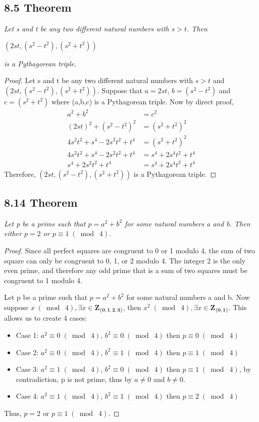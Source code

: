 \documentclass{article}
\begin{document}
\subsection*{8.5 Theorem} 
\quad \textit{Let s and t be any two different natural numbers with $s > t$. Then}
\begin{center}
    $(2st,(s^2-t^2),(s^2+t^2))$
\end{center}
\textit{is a Pythagorean triple.}

\begin{proof}
Let s and t be any two different natural numbers with $s > t$ and $(2st,(s^2-t^2),(s^2+t^2))$. Suppose that $a = 2st$, $b = (s^2-t^2)$ and $c = (s^2+t^2)$ where (a,b,c) is a Pythagorean triple. Now by direct proof,
\begin{align*}
    && a^2 + b^2 &= c^2&&\\
    && (2st)^2 + (s^2-t^2)^2 &= (s^2+t^2)^2&&\\
    && 4s^2t^2 + s^4-2s^2t^2+t^4 &= (s^2+t^2)^2&&\\
    && 4s^2t^2 + s^4 - 2s^2t^2 + t^4 &= s^4 + 2s^4t^2 + t^4&&\\
    && s^4 + 2s^2t^2 + t^4 &= s^4 + 2s^4t^2 + t^4&&
\end{align*}
Therefore, $(2st,(s^2-t^2),(s^2+t^2))$ is a Pythagorean triple.
\end{proof}

\subsection*{8.14 Theorem} 
\quad \textit{Let p be a prime such that $p = a^2 + b^2$ for some natural numbers a and b. Then either $p = 2$ or $p \equiv 1 \;(\bmod\; 4)$.}

\begin{proof}
Since all perfect squares are congruent to 0 or 1 modulo 4, the sum of two square can only be congruent to 0, 1, or 2 modulo 4. The integer 2 is the only even prime, and therefore any odd prime that is a sum of two squares must be congruent to 1 modulo 4.

Let p be a prime such that $p = a^2 + b^2$ for some natural numbers a and b. Now suppose $x \;(\bmod\; 4), \exists x \in \mathbf{Z_{\{0,1,2,3\}}}$, then $x^2 \;(\bmod\; 4), \exists x \in \mathbf{Z_{\{0,1\}}}$. This allows us to create 4 cases:
\begin{itemize}
    \item Case 1: $a^2 \equiv 0 \;(\bmod\; 4)$, $b^2 \equiv 0 \;(\bmod\; 4)$ then $p \equiv 0 \;(\bmod\; 4)$
    \item Case 2: $a^2 \equiv 0 \;(\bmod\; 4)$, $b^2 \equiv 1 \;(\bmod\; 4)$ then $p \equiv 1 \;(\bmod\; 4)$
    \item Case 3: $a^2 \equiv 1 \;(\bmod\; 4)$, $b^2 \equiv 0 \;(\bmod\; 4)$ then $p \equiv 1 \;(\bmod\; 4)$, by contradiction, p is not prime, thus by $a \neq 0$ and $b \neq 0$.
    \item Case 4: $a^2 \equiv 1 \;(\bmod\; 4)$, $b^2 \equiv 1 \;(\bmod\; 4)$ then $p \equiv 2 \;(\bmod\; 4)$
\end{itemize}
Thus, $p = 2$ or $p \equiv 1 \;(\bmod\; 4)$.
\end{proof}
\end{document}

